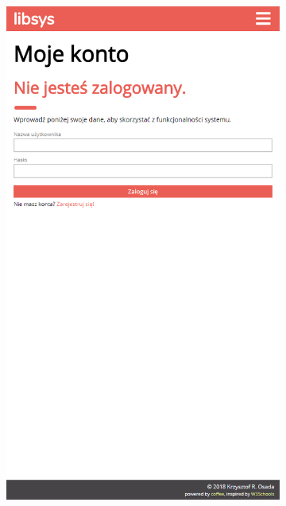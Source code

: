 \documentclass[12pt, a4paper]{article}
\begin{document}
\begin{figure}[h]
\centering
\begin{subfigure}{.4\textwidth}
    \centering
    \includegraphics[width=.75\linewidth]{img/libsys_account_1.png}
\end{subfigure}\quad
\begin{subfigure}{.4\textwidth}
    \centering

\end{subfigure}
\end{figure}
\end{document}

